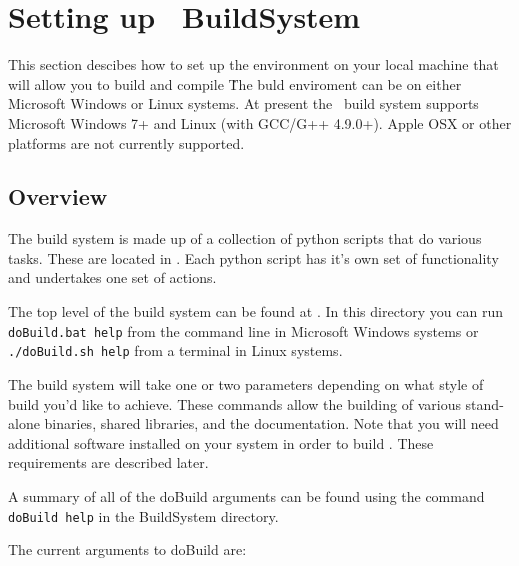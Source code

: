 \section{Setting up \CNAME\ BuildSystem\label{sec:build_environment}}

This section descibes how to set up the environment on your local machine that will allow you to build and compile \CNAME\. The buld enviroment can be on either Microsoft Windows or Linux systems. At present the \CNAME\ build system supports Microsoft Windows 7+ and Linux (with GCC/G++ 4.9.0+). Apple OSX or other platforms are not currently supported.

\subsection{Overview}

The build system is made up of a collection of python scripts that do various tasks. These are located in . Each python script has it’s own set of functionality and undertakes one set of actions. 

The top level of the build system can be found at . In this directory you can run \texttt{doBuild.bat help} from the command line in Microsoft Windows systems or \texttt{./doBuild.sh help} from a terminal in Linux systems.

The build system will take one or two parameters depending on what style of build you’d like to achieve. These commands allow the building of various stand-alone binaries, shared libraries, and the documentation. Note that you will need additional software installed on your system in order to build \CNAME . These requirements are described later.

A summary of all of the doBuild arguments can be found using the command \texttt{doBuild help} in the BuildSystem directory.

The current arguments to doBuild are: 

